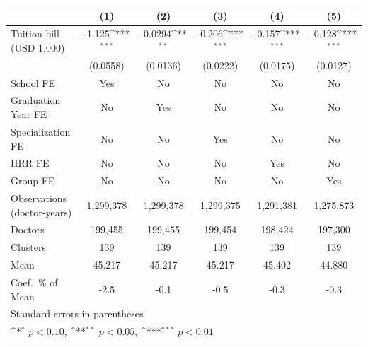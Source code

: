{
\def\sym#1{\ifmmode^{#1}\else\(^{#1}\)\fi}
\begin{tabular}{l*{5}{c}}
\hline\hline
                    &\multicolumn{1}{c}{(1)}         &\multicolumn{1}{c}{(2)}         &\multicolumn{1}{c}{(3)}         &\multicolumn{1}{c}{(4)}         &\multicolumn{1}{c}{(5)}         \\
\hline
Tuition bill (USD 1,000)&      -1.125\sym{***}&     -0.0294\sym{**} &      -0.206\sym{***}&      -0.157\sym{***}&      -0.128\sym{***}\\
                    &    (0.0558)         &    (0.0136)         &    (0.0222)         &    (0.0175)         &    (0.0127)         \\
[1em]
School FE           &         Yes         &          No         &          No         &          No         &          No         \\
[1em]
Graduation Year FE  &          No         &         Yes         &          No         &          No         &          No         \\
[1em]
Specialization FE   &          No         &          No         &         Yes         &          No         &          No         \\
[1em]
HRR FE              &          No         &          No         &          No         &         Yes         &          No         \\
[1em]
Group FE            &          No         &          No         &          No         &          No         &         Yes         \\
\hline
Observations (doctor-years)&   1,299,378         &   1,299,378         &   1,299,375         &   1,291,381         &   1,275,873         \\
Doctors             &     199,455         &     199,455         &     199,454         &     198,424         &     197,300         \\
Clusters            &         139         &         139         &         139         &         139         &         139         \\
Mean                &      45.217         &      45.217         &      45.217         &      45.402         &      44.880         \\
Coef.\ \% of Mean   &        -2.5         &        -0.1         &        -0.5         &        -0.3         &        -0.3         \\
\hline\hline
\multicolumn{6}{l}{\footnotesize Standard errors in parentheses}\\
\multicolumn{6}{l}{\footnotesize \sym{*} \(p<0.10\), \sym{**} \(p<0.05\), \sym{***} \(p<0.01\)}\\
\end{tabular}
}
